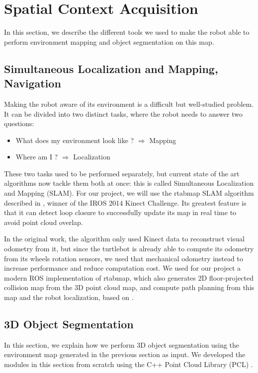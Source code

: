 \section{Spatial Context Acquisition}
In this section, we describe the different tools we used to make the robot able to perform environment mapping and object segmentation on this map.

\subsection{Simultaneous Localization and Mapping, Navigation}
Making the robot aware of its environment is a difficult but well-studied problem. It can be divided into two distinct tasks, where the robot needs to answer two questions:
\begin{itemize}
    \item{What does my environment look like ? $\Rightarrow$ Mapping}
    \item{Where am I ? $\Rightarrow$ Localization}
\end{itemize}

These two tasks used to be performed separately, but current state of the art algorithms now tackle them both at once: this is called Simultaneous Localization and Mapping (SLAM). For our project, we will use the rtabmap SLAM algorithm described in \cite{rtabmap}, winner of the IROS 2014 Kinect Challenge. Its greatest feature is that it can detect loop closure to successfully update its map in real time to avoid point cloud overlap.

In the original work, the algorithm only used Kinect data to reconstruct visual odometry from it, but since the turtlebot is already able to compute its odometry from its wheels rotation sensors, we used that mechanical odometry instead to increase performance and reduce computation cost. We used for our project a modern ROS implementation of rtabmap, which also generates 2D floor-projected collision map from the 3D point cloud map, and compute path planning from this map and the robot localization, based on \cite{rgbd-slam}\cite{loop-closure}.

\subsection{3D Object Segmentation}
\label{section:object_seg}
In this section, we explain how we perform 3D object segmentation using the environment map generated in the previous section as input. We developed the modules in this section from scratch using the C++ Point Cloud Library (PCL) \cite{PCL}.

